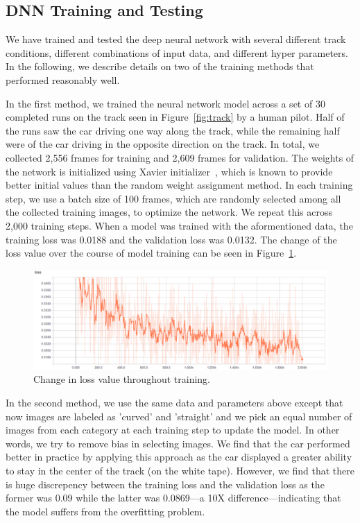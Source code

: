 \subsection{DNN Training and Testing}
We have trained and tested the deep neural network with several
different track conditions, different combinations of input
data, and different hyper parameters. In the following, we describe
details on two of the training methods that performed reasonably well.

In the first method, we trained the neural network model across a set 
of 30 completed runs on the track seen in Figure~\ref{fig:track} by a
human pilot. Half of the runs saw the car driving one way along the
track, while the remaining half were of the car driving in the
opposite direction on the track.
In total, we collected 2,556 frames for training and 2,609 
frames for validation.
The weights of the network is initialized using Xavier
initializer~\cite{Glorot2010}, which is known to provide better
initial values than the random weight assignment method.
In each training step, we use a batch
size of 100 frames, which are randomly selected among all the
collected training images, to optimize the network.
We repeat this across 2,000 training steps. When a model was trained
with the  aformentioned data, the training loss was 0.0188 and the
validation  loss was 0.0132.
The change of the loss value over the course of model training can be
seen in Figure~\ref{fig:modelloss}.

\begin{figure}[t]
  \centering
  \includegraphics[width=.9\textwidth]{figs/TrainingLoss}
  \caption{Change in loss value throughout training.}
  \label{fig:modelloss}
\end{figure}

In the second method, we use the same data and parameters above except
that now images are labeled as 'curved' and 'straight' and we pick an
equal number of images from each category at each training step to
update the model. In other words, we try to remove bias in selecting
images. We find that the car performed better in practice by applying
this approach as the car displayed a greater ability to stay in the
center of the track (on the white tape).
However, we find that there is huge discrepency between the training
loss and the validation loss as the former was 0.09 while the latter
was 0.0869---a 10X difference---indicating that the model suffers from
the overfitting problem.

